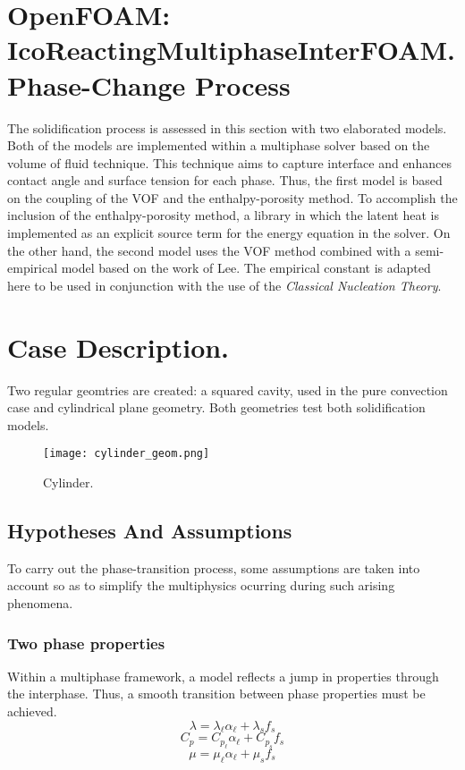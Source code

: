 \clearpage
\section{OpenFOAM: IcoReactingMultiphaseInterFOAM. Phase-Change Process}
The solidification process is assessed in this section with two elaborated models. Both of the models are implemented within a multiphase solver based on the volume of fluid technique. This technique aims to capture interface and enhances contact angle and surface tension for each phase. Thus, the first model is based on the coupling of the VOF and the enthalpy-porosity method. To accomplish the inclusion of the enthalpy-porosity method, a library in which the latent heat is implemented as an explicit source term for the energy equation in the solver. On the other hand, the second model uses the VOF method combined with a semi-empirical model based on the work of Lee. The empirical constant is adapted here to be used in conjunction with the use of the \textit{Classical Nucleation Theory}.
\section{Case Description.}
Two regular geomtries are created: a squared cavity, used in the pure convection case and cylindrical plane geometry. Both geometries test both solidification models.
\begin{figure}[h!]
	\texttt{[image: cylinder\_geom.png]}\hfill	
	\caption{Cylinder.}\label{3.4efig}
\end{figure}

\subsection{Hypotheses And Assumptions}
To carry out the phase-transition process, some assumptions are taken into account so as to simplify the multiphysics ocurring during such arising phenomena. 
\subsubsection*{Two phase properties}
Within a multiphase framework, a model reflects a jump in properties through the interphase. Thus, a smooth transition between phase properties must be achieved.
\begin{equation}
\lambda=\lambda_{\ell} \alpha_{\ell}+\lambda_{s} f_{s}
\label{3.34}
\end{equation}
\begin{equation}
C_{p}=C_{p_{\ell}} \alpha_{\ell}+C_{p_{s}} f_{s}
\label{3.35}
\end{equation}
\begin{equation}
\mu=\mu_{\ell} \alpha_{\ell}+\mu_{s} f_{s}
\label{3.36}
\end{equation}

